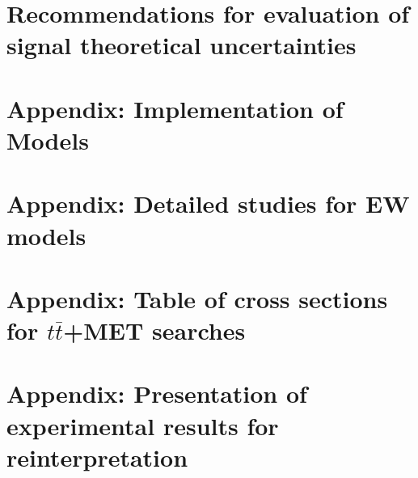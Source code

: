 \documentclass[a4paper,debug,notitlepage,nobib]{tufte-book}
\begin{document}
 \chapter{Recommendations for evaluation of signal theoretical uncertainties}
 \label{sec:TheoryUncertainties} 
 




\appendix

\chapter{Appendix: Implementation of Models}
\label{app:MonojetLikeModels_Appendix}


\chapter{Appendix: Detailed studies for EW models}
\label{app:EWSpecificModels_Appendix}


\chapter{\texorpdfstring{Appendix: Table of cross sections for $t\bar{t}$+MET searches}{Appendix: Table of cross sections for  ttbar+MET searches}}
\label{app:TTBar_Xsecs}


\chapter{Appendix: Presentation of experimental results for reinterpretation}
\label{app:Presentation_Of_Experimental_Results}


% 


\end{document}
